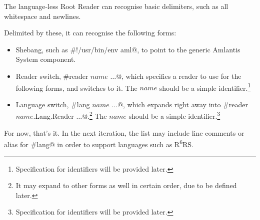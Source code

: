 The language-less Root Reader can recognise basic delimiters, such as all whitespace and newlines. 

Delimited by these, it can recognise the following forms:

\begin{itemize}
  \item Shebang, such as \lstinline@#!/usr/bin/env aml@, to point to the generic Amlantis System component.
  \item Reader switch, \lstinline@#reader $name$ $\ldots$@, which specifies a reader to use for the following forms, and switches to it. The $name$ should be a simple identifier.\footnote{Specification for identifiers will be provided later.}
  \item Language switch, \lstinline@#lang $name$ $\ldots$@, which expands right away into \lstinline@#reader $name$.Lang.Reader $\ldots$@.\footnote{It may expand to other forms as well in certain order, due to be defined later.} The $name$ should be a simple identifier.\footnote{Specification for identifiers will be provided later.}
\end{itemize}


For now, that's it. In the next iteration, the list may include line comments or alias for \lstinline@#lang@ in order to support languages such as R\textsuperscript{6}RS.




